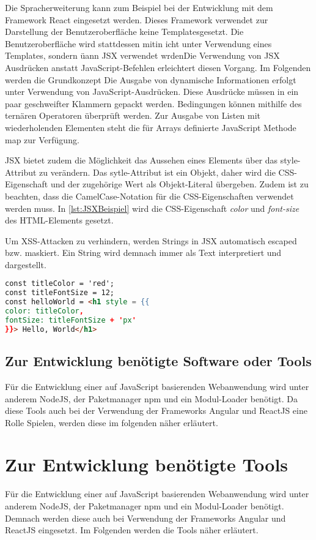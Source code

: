 Die Spracherweiterung kann zum Beispiel bei der Entwicklung mit dem Framework React eingesetzt werden. Dieses Framework verwendet zur Darstellung der Benutzeroberfläche keine Templatesgesetzt. Die Benutzeroberfläche wird stattdessen mitin icht unter Verwendung eines Templates, sondern üann JSX verwendet wrdenDie Verwendung von JSX Ausdrücken anstatt JavaScript-Befehlen erleichtert diesen Vorgang. Im Folgenden werden die Grundkonzept
Die Ausgabe von dynamische Informationen erfolgt unter Verwendung von JavaScript-Ausdrücken. Diese Ausdrücke müssen in ein paar geschweifter Klammern gepackt werden. Bedingungen können mithilfe des ternären Operatoren überprüft werden. Zur Ausgabe von Listen mit wiederholenden Elementen steht die für Arrays definierte JavaScript Methode map zur Verfügung.

JSX bietet zudem die Möglichkeit das Aussehen eines Elements über das style-Attribut zu verändern. Das sytle-Attribut ist ein Objekt, daher wird die CSS-Eigenschaft und der zugehörige Wert als Objekt-Literal übergeben. Zudem ist zu beachten, dass die CamelCase-Notation für die CSS-Eigenschaften verwendet werden muss. In \autoref{lst:JSXBeispiel} wird die CSS-Eigenschaft \textit{color} und \textit{font-size} des HTML-Elements gesetzt.

Um XSS-Attacken zu verhindern, werden Strings in JSX automatisch escaped bzw. maskiert. Ein String wird demnach immer als Text interpretiert und dargestellt.\autocites[vgl.][59\psqq]{Zeigermann.2016}[vgl.][65\psqq]{Stefanov.2017} 

\begin{lstlisting}[caption=Beispiel für die Verwendung von JSX, label=lst:JSXBeispiel, language=HTML]
const titleColor = 'red';
const titleFontSize = 12;
const helloWorld = <h1 style = {{
color: titleColor,
fontSize: titleFontSize + 'px'
}}> Hello, World</h1>
\end{lstlisting}



\subsection{Zur Entwicklung benötigte Software oder Tools}\label{sec:glTools}
Für die Entwicklung einer auf JavaScript basierenden Webanwendung wird unter anderem NodeJS, der Paketmanager npm und ein Modul-Loader benötigt. Da diese Tools auch bei der Verwendung der Frameworks Angular und ReactJS eine Rolle Spielen, werden diese  im folgenden näher erläutert.
\section{Zur Entwicklung benötigte Tools}
Für die Entwicklung einer auf JavaScript basierenden Webanwendung wird unter anderem NodeJS, der Paketmanager npm und ein Modul-Loader benötigt. Demnach werden diese auch bei Verwendung der Frameworks Angular und ReactJS eingesetzt. Im Folgenden werden die Tools näher erläutert.

